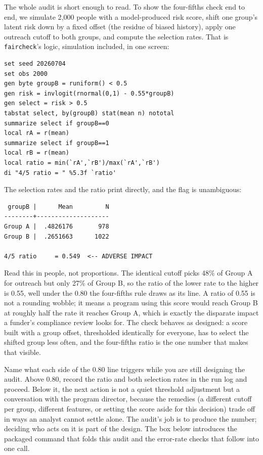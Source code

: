 \documentclass[
    a4paper,
    fontsize=10pt,
    twoside=true,
    numbers=noenddot,
]{kaobook}
\begin{document}
The whole audit is short enough to read. To show the four-fifths check end to end, we simulate 2{,}000 people with a model-produced risk score, shift one group's latent risk down by a fixed offset (the residue of biased history), apply one outreach cutoff to both groups, and compute the selection rates. That is \texttt{faircheck}'s logic, simulation included, in one screen:
\par
{\footnotesize
\begin{verbatim}
set seed 20260704
set obs 2000
gen byte groupB = runiform() < 0.5
gen risk = invlogit(rnormal(0,1) - 0.55*groupB)
gen select = risk > 0.5
tabstat select, by(groupB) stat(mean n) nototal
summarize select if groupB==0
local rA = r(mean)
summarize select if groupB==1
local rB = r(mean)
local ratio = min(`rA',`rB')/max(`rA',`rB')
di "4/5 ratio = " %5.3f `ratio'
\end{verbatim}
}
The selection rates and the ratio print directly, and the flag is unambiguous:
\par
{\footnotesize
\begin{verbatim}
 groupB |      Mean         N
--------+--------------------
Group A |  .4826176       978
Group B |  .2651663      1022

4/5 ratio     = 0.549  <-- ADVERSE IMPACT
\end{verbatim}
}
Read this in people, not proportions. The identical cutoff picks 48\% of Group A for outreach but only 27\% of Group B, so the ratio of the lower rate to the higher is 0.55, well under the 0.80 the four-fifths rule draws as its line. A ratio of 0.55 is not a rounding wobble; it means a program using this score would reach Group B at roughly half the rate it reaches Group A, which is exactly the disparate impact a funder's compliance review looks for. The check behaves as designed: a score built with a group offset, thresholded identically for everyone, has to select the shifted group less often, and the four-fifths ratio is the one number that makes that visible.

Name what each side of the 0.80 line triggers while you are still designing the audit. Above 0.80, record the ratio and both selection rates in the run log and proceed. Below it, the next action is not a quiet threshold adjustment but a conversation with the program director, because the remedies (a different cutoff per group, different features, or setting the score aside for this decision) trade off in ways an analyst cannot settle alone. The audit's job is to produce the number; deciding who acts on it is part of the design. The box below introduces the packaged command that folds this audit and the error-rate checks that follow into one call.
\end{document}
